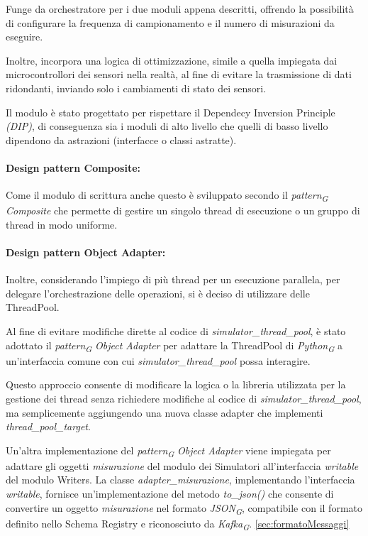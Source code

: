 Funge da orchestratore per i due moduli appena descritti, offrendo la possibilità di configurare la frequenza di campionamento e il numero di misurazioni da eseguire.

Inoltre, incorpora una logica di ottimizzazione, simile a quella impiegata dai microcontrollori dei sensori nella realtà, al fine di evitare la trasmissione di dati ridondanti, inviando solo i cambiamenti di stato dei sensori.

Il modulo è stato progettato per rispettare il Dependecy Inversion Principle \textit{(DIP)}, di conseguenza sia i moduli di alto livello che quelli di basso livello dipendono da astrazioni (interfacce o classi astratte).

\paragraph{Design pattern Composite:}
Come il modulo di scrittura anche questo è sviluppato secondo il \textit{pattern}\textsubscript{\textit{G}} \textit{Composite} che permette di gestire un singolo thread di esecuzione o un gruppo di thread in modo uniforme.

\paragraph{Design pattern Object Adapter:}
Inoltre, considerando l'impiego di più thread per un esecuzione parallela, per delegare l'orchestrazione delle operazioni, si è deciso di utilizzare delle ThreadPool.

Al fine di evitare modifiche dirette al codice di \textit{simulator\_thread\_pool}, è stato adottato il \textit{pattern}\textsubscript{\textit{G}} \textit{Object Adapter} per adattare la ThreadPool di \textit{Python}\textsubscript{\textit{G}} a un'interfaccia comune con cui \textit{simulator\_thread\_pool} possa interagire.

Questo approccio consente di modificare la logica o la libreria utilizzata per la gestione dei thread senza richiedere modifiche al codice di \textit{simulator\_thread\_pool}, ma semplicemente aggiungendo una nuova classe adapter che implementi \textit{thread\_pool\_target}.

Un'altra implementazione del \textit{pattern}\textsubscript{\textit{G}} \textit{Object Adapter} viene impiegata per adattare gli oggetti \textit{misurazione} del modulo dei Simulatori all'interfaccia \textit{writable} del modulo Writers. La classe \textit{adapter\_misurazione}, implementando l'interfaccia \textit{writable}, fornisce un'implementazione del metodo \textit{to\_json()} che consente di convertire un oggetto \textit{misurazione} nel formato \textit{JSON}\textsubscript{\textit{G}}, compatibile con il formato definito nello Schema Registry e riconosciuto da \textit{Kafka}\textsubscript{\textit{G}}.
\ref{sec:formatoMessaggi}

